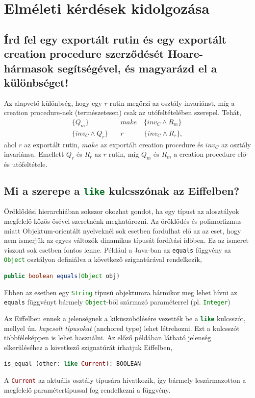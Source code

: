 \section*{Elméleti kérdések kidolgozása}
	
\subsection{ Írd fel egy exportált rutin és egy exportált creation procedure szerződését Hoare-hármasok segítségével, és magyarázd el a különbséget! }

	Az alapvető különbség, hogy egy $r$ rutin megőrzi az osztály invariánst, míg a creation procedure-nek (természetesen) csak az utófeltételében szerepel. Tehát,
	\begin{align*}
	\{Q_m\}\quad&make \quad\{inv_C\wedge R_m\} \\
	\{inv_C\wedge Q_r\} \quad&r\qquad\quad\{inv_C\wedge R_r\},
	\end{align*}
	ahol $r$ az exportált rutin, $make$ az exportált creation procedure és $inv_C$ az osztály invariánsa. Emellett $Q_r$ és $R_r$ az $r$ rutin, míg $Q_m$ és $R_m$ a creation procedure elő- és utófeltétele.


\subsection{ Mi a szerepe a \lstinline[language=Eiffel]|like| kulcsszónak az Eiffelben? }\label{like}

	Öröklődési hierarchiában sokszor okozhat gondot, ha egy típust az alosztályok megfelelő közös ősével szeretnénk meghatározni. Az öröklődés és polimorfizmus miatt Objektum-orientált nyelveknél sok esetben fordulhat elő az az eset, hogy nem ismerjük az egyes változók dinamikus típusát fordítási időben. Ez az ismeret viszont sok esetben fontos lenne. Például a Java-ban az \lstinline[language=Java]|equals| függvény az \lstinline[language=Java]|Object| osztályon definiálva a következő szignatúrával rendelkezik,
	\begin{lstlisting}[language=Java]
	public boolean equals(Object obj)
	\end{lstlisting}
	
	Ebben az esetben egy \lstinline[language=Java]|String| típusú objektumra bármikor meg lehet hívni az \lstinline[language=Java]|equals| függvényt bármely \lstinline[language=Java]|Object|-ből származó paraméterrel (pl. \lstinline[language=Java]|Integer|)
	
	Az Eiffelben ennek a jelenségnek a kiküszöbölésére vezették be a \lstinline[language=Eiffel]|like| kulcsszót, mellyel ún. \textit{kapcsolt típusokat} (anchored type) lehet létrehozni. Ezt a kulcsszót többféleképpen is lehet használni. Az előző példában látható jelenség elkerüléséhez a következő szignatúrát írhatjuk Eiffelben,
	\begin{lstlisting}[language=Eiffel]
	is_equal (other: like Current): BOOLEAN
	\end{lstlisting}
	A \lstinline[language=Eiffel]|Current| az aktuális osztály típusára hivatkozik, így bármely leszármazotton a megfelelő paramétertípussal fog rendelkezni a függvény.
	
